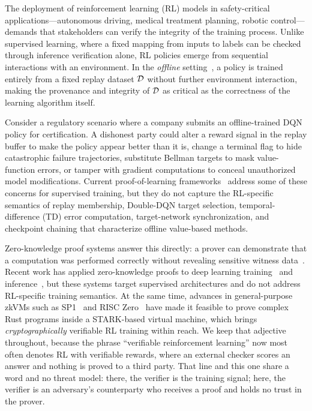 
The deployment of reinforcement learning (RL) models in safety-critical
applications---autonomous driving, medical treatment planning, robotic
control---demands that stakeholders can verify the integrity of the training
process. Unlike supervised learning, where a fixed
mapping from inputs to labels can be checked through inference verification
alone, RL policies emerge from sequential interactions with an environment.
In the \emph{offline} setting~\cite{levine2020offline}, a policy is trained
entirely from a fixed replay
dataset $\mathcal{D}$ without further environment interaction, making the
provenance and integrity of $\mathcal{D}$ as critical as the correctness of the
learning algorithm itself.

Consider a regulatory scenario where a company submits an offline-trained DQN
policy for certification. A dishonest party could alter a reward signal in the
replay buffer to make the policy appear better than it is, change a terminal
flag to hide catastrophic failure trajectories, substitute Bellman targets to
mask value-function errors, or tamper with gradient computations to conceal
unauthorized model modifications. Current proof-of-learning
frameworks~\cite{jia2021proofoflearning} address some of these concerns for
supervised training, but they do not capture the RL-specific semantics of replay
membership, Double-DQN target selection, temporal-difference (TD) error
computation, target-network synchronization, and checkpoint chaining that
characterize offline value-based methods.

Zero-knowledge proof systems answer this directly: a prover can
demonstrate that a computation was performed correctly without revealing
sensitive witness data~\cite{thalerbook}. Recent work has applied
zero-knowledge proofs to deep learning training~\cite{zkdl2023, kaizen2024,
zkpotvicinity2025} and inference~\cite{zkcnn2021, safetynets2017, vcnn2024},
but these systems target supervised architectures and do not address
RL-specific training semantics. At the same time, advances in general-purpose
zkVMs such as SP1~\cite{succinct2024sp1} and RISC Zero~\cite{risczero2023}
have made it feasible to prove complex Rust programs inside a STARK-based
virtual machine, which brings \emph{cryptographically} verifiable RL training
within reach. We keep that adjective throughout, because the phrase ``verifiable
reinforcement learning'' now most often denotes RL with verifiable rewards,
where an external checker scores an answer and nothing is proved to a third
party. That line and this one share a word and no threat model: there, the
verifier is the training signal; here, the verifier is an adversary's
counterparty who receives a proof and holds no trust in the prover.

